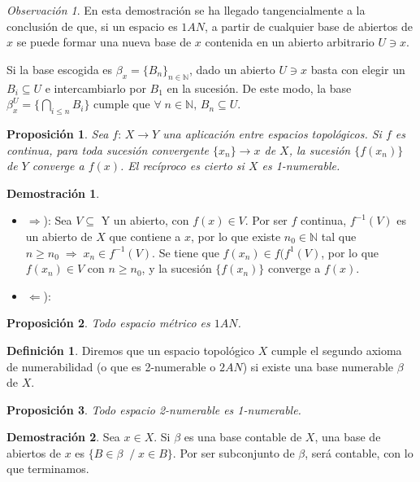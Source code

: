 \documentclass[12pt,twoside]{report}
\theoremstyle{azul}
\theoremstyle{azul2}
\theoremstyle{plain}
\newtheorem*{prop}{Proposición}
\theoremstyle{definition}
\newtheorem*{defi}{Definición}
\newtheorem*{dem}{Demostración}
\theoremstyle{remark}
\newtheorem*{obs}{Observación}
\begin{document}
\begin{obs}
En esta demostración se ha llegado tangencialmente a la conclusión de que, si un espacio es $1AN$, a partir de cualquier base de abiertos de $x$ se puede formar una nueva base de $x$ contenida en un abierto arbitrario $U \ni x$.

Si la base escogida es $\beta_x = \{B_n\}_{n \in \mathbb{N}}$, dado un abierto $U \ni x$ basta con elegir un $B_i \subseteq U$ e intercambiarlo por $B_1$ en la sucesión. De este modo, la base $\beta^U_x = \{\underset{i \leq n}{\bigcap} B_i\}$ cumple que $\forall \; n\in \mathbb{N}, \, B_n \subseteq U$. \textcolor{blue}{}
\end{obs}

\begin{prop}
Sea $f: \, X \to Y$ una aplicación entre espacios topológicos. Si $f$ es continua, para toda sucesión convergente $\{x_n\} \to x$ de $X$, la sucesión $\{f(x_n)\}$ de $Y$ converge a $f(x)$. El recíproco es cierto si $X$ es 1-numerable.
\end{prop}
\begin{dem}
\begin{itemize}
    \item $\Rightarrow$): Sea $V \subseteq$ Y un abierto, con $f(x) \in V$. Por ser $f$ continua, $f^{-1}(V)$ es un abierto de $X$ que contiene a $x$, por lo que existe $n_0 \in \mathbb{N}$ tal que $n \geq n_0 \;\Rightarrow\; x_n \in f^{-1}(V)$. Se tiene que $f(x_n) \in f(f^{1}(V)$, por lo que $f(x_n) \in V$ con $n \geq n_0$, y la sucesión $\{f(x_n)\}$ converge a $f(x)$.
    \item $\Leftarrow$): 
\end{itemize}
\end{dem}

\begin{prop}
Todo espacio métrico es $1AN$.
\end{prop}

\begin{defi}
Diremos que un espacio topológico $X$ cumple el segundo axioma de numerabilidad (o que es 2-numerable o $2AN$) si existe una base numerable $\beta$ de $X$.
\end{defi}

\begin{prop}
Todo espacio 2-numerable es 1-numerable.
\end{prop}
\begin{dem}
Sea $x \in X$. Si $\beta$ es una base contable de $X$, una base de abiertos de $x$ es $\{B \in \beta \;\; / \; x \in B\}$. Por ser subconjunto de $\beta$, será contable, con lo que terminamos.
\end{dem}
\end{document}
